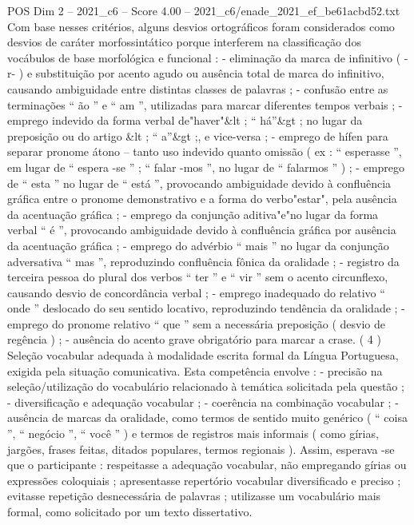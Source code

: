 \begin{textsample}{POS Dim 2 – 2021\_c6 – Score 4.00 – 2021\_c6/enade\_2021\_ef\_be61acbd52.txt}
Com base nesses critérios, alguns desvios ortográficos foram considerados como desvios de caráter morfossintático porque interferem na classificação dos vocábulos de base morfológica e funcional : - eliminação da marca de infinitivo ( -r- ) e substituição por acento agudo ou ausência total de marca do infinitivo, causando ambiguidade entre distintas classes de palavras ; - confusão entre as terminações “ ão ” e “ am ”, utilizadas para marcar diferentes tempos verbais ; - emprego indevido da forma verbal de"haver"\&lt ; “ há”\&gt ; no lugar da preposição ou do artigo \&lt ; “ a”\&gt ;, e vice-versa ; - emprego de hífen para separar pronome átono – tanto uso indevido quanto omissão ( ex : “ esperasse ”, em lugar de “ espera -se ” ; “ falar -mos ”, no lugar de “ falarmos ” ) ; - emprego de “ esta ” no lugar de “ está ”, provocando ambiguidade devido à confluência gráfica entre o pronome demonstrativo e a forma do verbo"estar", pela ausência da acentuação gráfica ; - emprego da conjunção aditiva"e"no lugar da forma verbal “ é ”, provocando ambiguidade devido à confluência gráfica por ausência da acentuação gráfica ; - emprego do advérbio “ mais ” no lugar da conjunção adversativa “ mas ”, reproduzindo confluência fônica da oralidade ; - registro da terceira pessoa do plural dos verbos “ ter ” e “ vir ” sem o acento circunflexo, causando desvio de concordância verbal ; - emprego inadequado do relativo “ onde ” deslocado do seu sentido locativo, reproduzindo tendência da oralidade ; - emprego do pronome relativo “ que ” sem a necessária preposição ( desvio de regência ) ; - ausência do acento grave obrigatório para marcar a crase. ( 4 ) Seleção vocabular adequada à modalidade escrita formal da Língua Portuguesa, exigida pela situação comunicativa.
Esta competência envolve : - precisão na seleção/utilização do vocabulário relacionado à temática solicitada pela questão ; - diversificação e adequação vocabular ; - coerência na combinação vocabular ; - ausência de marcas da oralidade, como termos de sentido muito genérico ( “ coisa ”, “ negócio ”, “ você ” ) e termos de registros mais informais ( como gírias, jargões, frases feitas, ditados populares, termos regionais ).
Assim, esperava -se que o participante : respeitasse a adequação vocabular, não empregando gírias ou expressões coloquiais ; apresentasse repertório vocabular diversificado e preciso ; evitasse repetição desnecessária de palavras ; utilizasse um vocabulário mais formal, como solicitado por um texto dissertativo.

\end{textsample}

